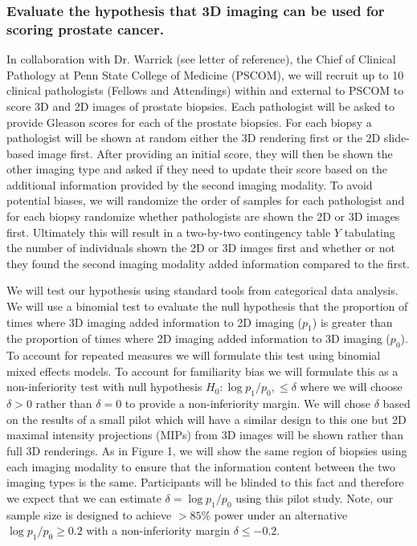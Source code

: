 \documentclass{NIHGrant}
\theoremstyle{theorem}
\begin{document}
\subsubsection*{Evaluate the hypothesis that 3D imaging can be used for scoring prostate cancer.}
In collaboration with Dr. Warrick (see letter of reference), the Chief of Clinical Pathology at Penn State College of Medicine (PSCOM), we will recruit up to 10 clinical pathologists (Fellows and Attendings) within and external to PSCOM to score 3D and 2D images of prostate biopsies. Each pathologist will be asked to provide Gleason scores for each of the prostate biopsies. For each biopsy a pathologist will be shown at random either the 3D rendering first or the 2D slide-based image first. After providing an initial score, they will then be shown the other imaging type and asked if they need to update their score based on the additional information provided by the second imaging modality. To avoid potential biases, we will randomize the order of samples for each pathologist and for each biopsy randomize whether pathologists are shown the 2D or 3D images first. Ultimately this will result in a two-by-two contingency table \(Y\) tabulating the number of individuals shown the 2D or 3D images first and whether or not they found the second imaging modality added information compared to the first.

We will test our hypothesis using standard tools from categorical data analysis. We will use a binomial test to evaluate the null hypothesis that the proportion of times where 3D imaging added information to 2D imaging (\(p_{1}\)) is greater than the proportion of times where 2D imaging added information to 3D imaging (\(p_{0}\)). To account for repeated measures we will formulate this test using binomial mixed effects models. To account for familiarity bias we will formulate this as a non-inferiority test with null hypothesis \(H_{0}:\log p_{1}/p_{0},\leq \delta\) where we will choose  \(\delta>0\) rather than \(\delta=0\) to provide a non-inferiority margin. We will chose \(\delta\) based on the results of a small pilot which will have a similar design to this one but 2D maximal intensity projections (MIPs) from 3D images will be shown rather than full 3D renderings. As in Figure 1, we will show the same region of biopsies using each imaging modality to ensure that the information content between the two imaging types is the same. Participants will be blinded to this fact and therefore we expect that we can estimate \(\delta=\log p_{1}/p_{0}\) using this pilot study. Note, our sample size is designed to achieve \(>85\%\) power under an alternative \(\log p_{1}/p_{0}\geq 0.2\) with a non-inferiority margin \(\delta\leq-0.2\).
\end{document}
